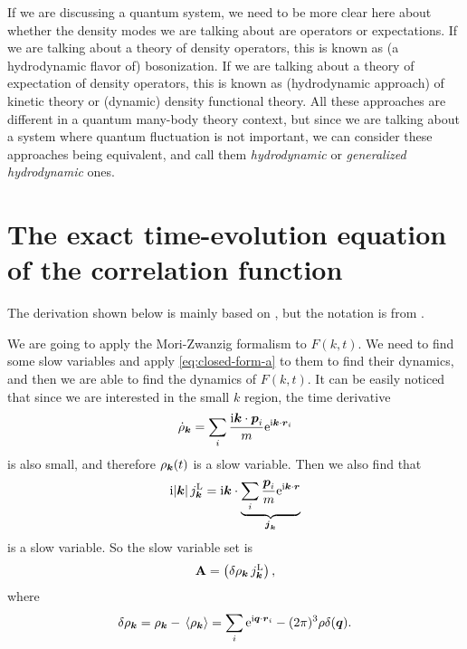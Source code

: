 \documentclass[hyperref, a4paper]{article}
\newcommand*{\ii}{\mathrm{i}}
\newcommand*{\ee}{\mathrm{e}}
\def\\{}%
\begin{document}
\begin{note*}{}{}
    If we are discussing a quantum system, we need to be more clear here about whether the density modes we are
    talking about are operators or expectations. If we are talking about a theory of density operators, 
    this is known as (a hydrodynamic flavor of) bosonization. If we are talking about a theory of expectation
    of density operators, this is known as (hydrodynamic approach) of kinetic theory or (dynamic) density 
    functional theory. All these approaches are different in a quantum many-body theory context, but 
    since we are talking about a system where quantum fluctuation is not important, we can consider these 
    approaches being equivalent, and call them \emph{hydrodynamic} or \emph{generalized hydrodynamic} ones. 
\end{note*}

\section{The exact time-evolution equation of the correlation function} 

The derivation shown below is mainly based on \cite{mct2005}, but the notation is from \cite{RevModPhys.76.785}. 

We are going to apply the Mori-Zwanzig formalism to $F(k, t)$. We need to find some slow variables
and apply \eqref{eq:closed-form-a} to them to find their dynamics, and then we are able to find the dynamics 
of $F(k, t)$. It can be easily noticed that since we are interested in the small $k$ region, the time derivative 
\[
    \dot{\rho}_{\vb*{k}} = \sum_i \frac{\ii \vb*{k} \cdot \vb*{p}_i}{m} \ee^{\ii \vb*{k} \cdot \vb*{r}_i }
\]
is also small, and therefore $\rho_{\vb*{k}}(t)$ is a slow variable. Then we also find that 
\[
    \ii \abs*{\vb*{k}} j_{\vb*{k}}^\text{L} = \ii \vb*{k} \cdot 
    \underbrace{\sum_{i} \frac{\vb*{p}_i}{m} \ee^{\ii \vb*{k} \cdot \vb*{r}}}_{\vb*{j}_{\vb*{k}}}
\]
is a slow variable. So the slow variable set is 
\begin{equation}
    \vb{A} = \pmqty{\var{\rho_{\vb*{k}}} \\ j_{\vb*{k}}^\text{L}},  
\end{equation}
where 
\begin{equation}
    \var{\rho_{\vb*{k}}} = \rho_{\vb*{k}} - \expval*{\rho_{\vb*{k}}} 
    = \sum_{i} \ee^{\ii \vb*{q} \cdot \vb*{r}_i} - (2\pi)^3 \rho \delta(\vb*{q}).
\end{equation}
\end{document}
